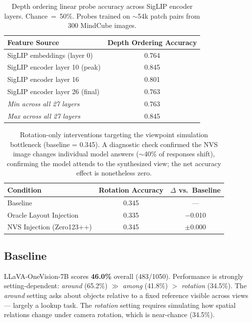 \documentclass[11pt]{article}
\begin{document}
\begin{table}[h]
\centering
\caption{Depth ordering linear probe accuracy across SigLIP encoder layers.
Chance~=~50\%. Probes trained on ${\sim}$54k patch pairs from 300 MindCube images.}
\label{tab:probe}
\begin{tabular}{lc}
\toprule
Feature Source & Depth Ordering Accuracy \\
\midrule
SigLIP embeddings (layer 0)          & 0.764 \\
SigLIP encoder layer 10 (peak)       & 0.845 \\
SigLIP encoder layer 16              & 0.801 \\
SigLIP encoder layer 26 (final)      & 0.763 \\
\midrule
\textit{Min across all 27 layers}    & 0.763 \\
\textit{Max across all 27 layers}    & 0.845 \\
\bottomrule
\end{tabular}
\end{table}

\begin{table}[h]
\centering
\caption{Rotation-only interventions targeting the viewpoint simulation bottleneck
(baseline = 0.345). A diagnostic check confirmed the NVS image changes individual
model answers ($\sim$40\% of responses shift), confirming the model attends to
the synthesized view; the net accuracy effect is nonetheless zero.}
\label{tab:oracle}
\begin{tabular}{lcc}
\toprule
Condition & Rotation Accuracy & $\Delta$ vs.\ Baseline \\
\midrule
Baseline                     & 0.345 & ---      \\
Oracle Layout Injection      & 0.335 & $-$0.010 \\
NVS Injection (Zero123++)    & 0.345 & $\pm$0.000 \\
\bottomrule
\end{tabular}
\end{table}

\subsection{Baseline}
LLaVA-OneVision-7B scores \textbf{46.0\%} overall (483/1050).
Performance is strongly setting-dependent:
\textit{around} (65.2\%) $\gg$ \textit{among} (41.8\%) $>$ \textit{rotation} (34.5\%).
The \textit{around} setting asks about objects relative to a fixed reference visible
across views --- largely a lookup task.
The \textit{rotation} setting requires simulating how spatial relations change under
camera rotation, which is near-chance (34.5\%).
\end{document}
